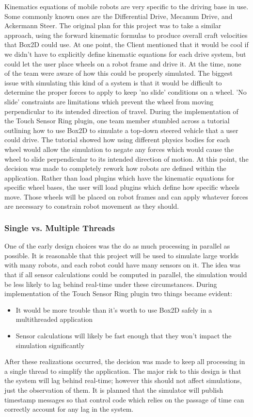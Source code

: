 	Kinematics equations of mobile robots are very specific to the driving base in use. Some commonly known ones are the Differential Drive, Mecanum Drive, and Ackermann Steer.
	The original plan for this project was to take a similar approach, using the forward kinematic formulas to produce overall craft velocities that Box2D could use. At one point, the Client mentioned that it would be cool if we didn't have to explicitly define kinematic equations for each drive system, but could let the user place wheels on a robot frame and drive it. At the time, none of the team were aware of how this could be properly simulated. The biggest issue with simulating this kind of a system is that it would be difficult to determine the proper forces to apply to keep 'no slide' conditions on a wheel. 'No slide' constraints are limitations which prevent the wheel from moving perpendicular to its intended direction of travel.
	During the implementation of the Touch Sensor Ring plugin, one team member stumbled across a tutorial outlining how to use Box2D to simulate a top-down steered vehicle that a user could drive. The tutorial showed how using different physics bodies for each wheel would allow the simulation to negate any forces which would cause the wheel to slide perpendicular to its intended direction of motion. 
	At this point, the decision was made to completely rework how robots are defined within the application. Rather than load plugins which have the kinematic equations for specific wheel bases, the user will load plugins which define how specific wheels move. Those wheels will be placed on robot frames and can apply whatever forces are necessary to constrain robot movement as they should.
	
	\subsubsection*{Single vs. Multiple Threads}
	One of the early design choices was the do as much processing in parallel as possible. It is reasonable that this project will be used to simulate large worlds with many robots, and each robot could have many sensors on it. The idea was that if all sensor calculations could be computed in parallel, the simulation would be less likely to lag behind real-time under these circumstances.
	During implementation of the Touch Sensor Ring plugin two things became evident:
	\begin{itemize}
		\item It would be more trouble than it's worth to use Box2D safely in a multithreaded application
		\item Sensor calculations will likely be fast enough that they won't impact the simulation significantly
	\end{itemize}
	After these realizations occurred, the decision was made to keep all processing in a single thread to simplify the application. The major risk to this design is that the system will lag behind real-time; however this should not affect simulations, just the observation of them. It is planned that the simulator will publish timestamp messages so that control code which relies on the passage of time can correctly account for any lag in the system.

